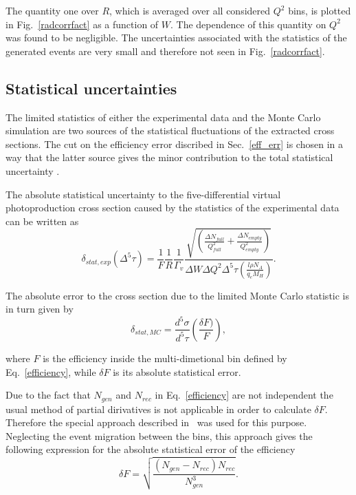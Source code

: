 \documentclass[prc,twocolumn,superscriptaddress,showpacs,amssymb,amsmath,amsfonts,linenumbers,aps]{revtex4-1}
\begin{document}
 The quantity one over $R$, which is averaged over all considered $Q^{2}$ bins, is plotted in  Fig.~\ref{radcorrfact} as a function of $W$. The dependence of this quantity on $Q^{2}$ was found to be negligible.  The uncertainties associated with the statistics of the generated events are very small and therefore  not seen in Fig.~\ref{radcorrfact}.















\subsection{Statistical uncertainties}
\label{stat_unc}

The limited statistics of either the experimental data and the Monte Carlo simulation  are two sources of the statistical fluctuations of the extracted cross sections.
The cut on the efficiency error discribed in Sec.~\ref{eff_err} is chosen in a way that the latter source gives the minor contribution to the total statistical uncertainty .


The absolute statistical  uncertainty to the five-differential
virtual photoproduction cross section caused by the statistics of the experimental data can be written as
 \begin{equation}
\delta_{stat,exp}(\Delta^{5} \tau) = \frac{1}{F} \frac{1}{R}
\frac{1}{ \Gamma_{v} }
\frac{\sqrt{\left( \frac{\Delta
N_{full}}{Q_{full}^{2}}+\frac{\Delta N_{empty}}{Q_{empty}^{2}} \right) } }{
\Delta W \Delta Q^{2} \Delta^{5} \tau \left( \frac{l \rho N_{A}}{q_{e}M_{H}} \right)}.
\label{staterrors}
\end{equation}


The absolute error to the cross section due to the limited Monte Carlo statistic is  in turn given by
\begin{equation}
\delta_{stat,MC} = \frac{d^{5}\sigma}{d^{5}\tau} \left( \frac{\delta F)}{F} \right),
\label{montecarloerror}
\end{equation}

where $F$ is the efficiency inside the multi-dimetional bin defined by Eq.~\eqref{efficiency}, while $\delta F$ is its absolute statistical error. 



Due to the fact that $N_{gen}$ and $N_{rec}$ in Eq.~\eqref{efficiency} are not independent the usual method of partial dirivatives is not applicable in order to calculate $\delta F$.
Therefore the special approach described in~\cite{Laforge:1996ts} was used for this purpose.
Neglecting the event migration between the bins, this approach gives the following expression for  
 the absolute statistical error of the efficiency
\begin{equation}
\delta F =
\sqrt{\frac{(N_{gen}-N_{rec})N_{rec}}{N_{gen}^{3}}}.
\label{efferror}
\end{equation}
\end{document}
